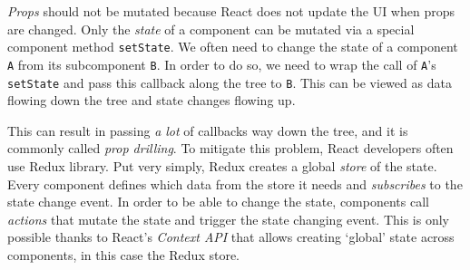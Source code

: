 \emph{Props} should not be mutated because React does not update the UI when props are changed. Only the \emph{state} of a component can be mutated via a special
component method \texttt{setState}. We often need to change the state of a component \texttt{A} from its subcomponent \texttt{B}. In order to do so, we need to wrap
the call of \texttt{A}'s \texttt{setState} and pass this callback along the tree to \texttt{B}. This can be viewed as data flowing down the tree and state changes
flowing up.

This can result in passing \emph{a lot} of callbacks way down the tree, and it is commonly called \emph{prop drilling}. To mitigate this problem, React developers
often use Redux library. Put very simply, Redux creates a global \emph{store} of the state. Every component defines which data from the store it needs and
\emph{subscribes} to the state change event. In order to be able to change the state, components call \emph{actions} that mutate the state and trigger the state
changing event. This is only possible thanks to React's \emph{Context API} that allows creating `global' state across components, in this case the Redux store.

